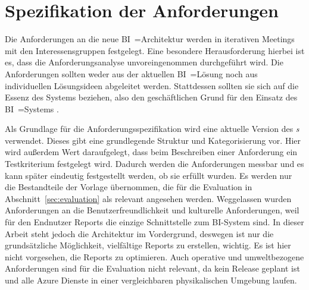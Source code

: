 \section{Spezifikation der Anforderungen}
Die Anforderungen an die neue BI~=Architektur werden in iterativen Meetings mit den Interessensgruppen festgelegt. Eine besondere Herausfor\-der\-ung hierbei ist es, dass die Anforderungsanalyse unvoreingenommen durchgeführt wird. Die Anforderungen sollten weder aus der aktuellen BI~=Lösung noch aus individuellen Lösungsideen abgeleitet werden. Stattdessen sollten sie sich auf die Essenz des Systems beziehen, also den geschäftlichen Grund für den Einsatz des BI~=Systems \cite[vgl.][]{robertson_mastering_2013}.

Als Grundlage für die Anforderungsspezifikation wird eine aktuelle Version des \textit{s} \cite{robertson_volere_2020} verwendet. Dieses gibt eine grundlegende Struktur und Kategorisierung vor. Hier wird außerdem Wert daraufgelegt, dass beim Beschreiben einer Anforderung ein Testkriterium festgelegt wird. Dadurch werden die Anforderungen messbar und es kann später eindeutig festgestellt werden, ob sie erfüllt wurden. Es werden nur die Bestandteile der Vorlage übernommen, die für die Evaluation in Abschnitt~\ref{sec:evaluation} als relevant angesehen werden. Weggelassen wurden Anforderungen an die Benutzerfreundlichkeit und kulturelle Anforderungen, weil für den Endnutzer Reports die einzige Schnittstelle zum BI-System sind. In dieser Arbeit steht jedoch die Architektur im Vordergrund, deswegen ist nur die grundsätzliche Möglichkeit, vielfältige Reports zu erstellen, wichtig. Es ist hier nicht vorgesehen, die Reports zu optimieren. Auch operative und umweltbezogene Anforderungen sind für die Evaluation nicht relevant, da kein Release geplant ist und alle Azure Dienste in einer vergleichbaren physikalischen Umgebung laufen.